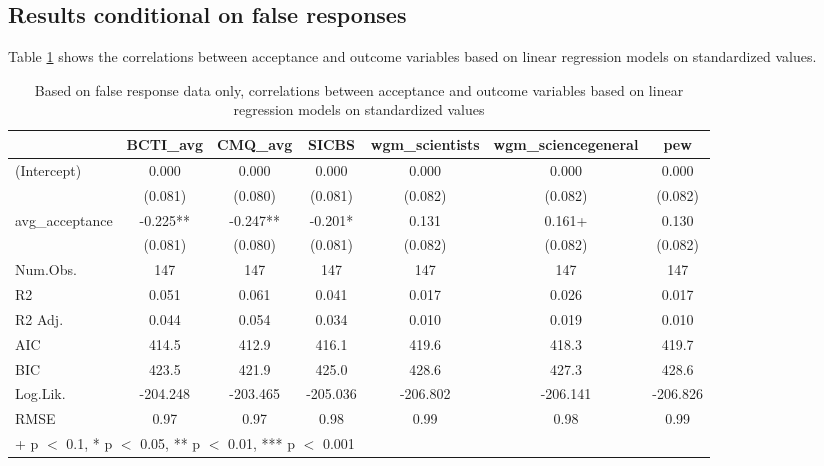 \documentclass[
  doc,floatsintext]{apa6}
\begin{document}
\subsection{Results conditional on false responses}\label{results-conditional-on-false-responses-1}

Table \ref{tab:exp2-false-response-regression} shows the correlations between acceptance and outcome variables based on linear regression models on standardized values.

\begin{table}
\centering
\caption{\label{tab:exp2-false-response-regression}Based on false response data only, correlations between acceptance and outcome variables based on linear regression models on standardized values}
\centering
\begin{tabular}[t]{lcccccc}
\toprule
  & BCTI\_avg & CMQ\_avg & SICBS & wgm\_scientists & wgm\_sciencegeneral & pew\\
\midrule
(Intercept) & 0.000 & 0.000 & 0.000 & 0.000 & 0.000 & 0.000\\
 & (0.081) & (0.080) & (0.081) & (0.082) & (0.082) & \vphantom{1} (0.082)\\
avg\_acceptance & -0.225** & -0.247** & -0.201* & 0.131 & 0.161+ & 0.130\\
 & (0.081) & (0.080) & (0.081) & (0.082) & (0.082) & (0.082)\\
\midrule
Num.Obs. & 147 & 147 & 147 & 147 & 147 & 147\\
R2 & 0.051 & 0.061 & 0.041 & 0.017 & 0.026 & 0.017\\
R2 Adj. & 0.044 & 0.054 & 0.034 & 0.010 & 0.019 & 0.010\\
AIC & 414.5 & 412.9 & 416.1 & 419.6 & 418.3 & 419.7\\
BIC & 423.5 & 421.9 & 425.0 & 428.6 & 427.3 & 428.6\\
Log.Lik. & -204.248 & -203.465 & -205.036 & -206.802 & -206.141 & -206.826\\
RMSE & 0.97 & 0.97 & 0.98 & 0.99 & 0.98 & 0.99\\
\bottomrule
\multicolumn{7}{l}{\rule{0pt}{1em}+ p $<$ 0.1, * p $<$ 0.05, ** p $<$ 0.01, *** p $<$ 0.001}\\
\end{tabular}
\end{table}
\end{document}
